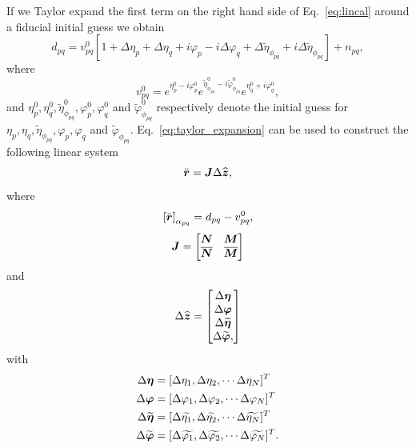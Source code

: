 \documentclass[useAMS,usenatbib]{mn2e}
\newcommand{\bz}{\bmath{z}}
\newcommand{\br}{\bmath{r}}
\newcommand{\bJ}{\bmath{J}}
\newcommand{\bN}{\bmath{N}}
\newcommand{\bM}{\bmath{M}}
\newcommand{\conj}[1]{\overline{#1}}
\begin{document}
If we Taylor expand the first term on the right hand side of Eq.~\eqref{eq:lincal} around a fiducial initial guess we obtain
\begin{equation}
\label{eq:taylor_expansion}
d_{pq} = v_{pq}^0[1+\Delta \eta_p + \Delta \eta_q + i \varphi_p - i \Delta \varphi_q + \Delta \widetilde{\eta}_{\phi_{pq}} + i\Delta \widetilde{\eta}_{\phi_{pq}}] + n_{pq}, 
\end{equation}
where
\begin{equation}
v_{pq}^0 = e^{\eta_p^0 - i \varphi_p^0} e^{\widetilde{\eta}_{\phi_{pq}}^0 - i \widetilde{\varphi}_{\phi_{pq}}^0} e^{\eta_q^0 + i \varphi_q^0}, 
\end{equation}
and $\eta_p^0,\eta_q^0,\widetilde{\eta}_{\phi_{pq}}^0,\varphi_p^0,\varphi_q^0$ and $\widetilde{\varphi}_{\phi_{pq}}^0$ respectively denote the initial guess for $\eta_p,\eta_q,\widetilde{\eta}_{\phi_{pq}},\varphi_p,\varphi_q$ and $\widetilde{\varphi}_{\phi_{pq}}$.
Eq.~\eqref{eq:taylor_expansion} can be used to construct the following linear system
\begin{equation}
\breve{\br} = \bJ\Delta\widehat{\bz}, 
\end{equation}
where 
\begin{equation}
\left [ \breve{\br} \right ]_{\alpha_{pq}} = d_{pq}-v_{pq}^0, 
\end{equation}
\begin{equation}
\label{eq:jac_lincal}
\bJ = \begin{bmatrix}
      \bN & \bM\\
      \conj{\bN} & \conj{\bM}
      \end{bmatrix}
\end{equation}
and
\begin{equation}
\Delta\widehat{\bz} = 
\begin{bmatrix}
\Delta \bmath{\eta} \\
\Delta \bmath{\varphi} \\
\Delta \widetilde{\bmath{\eta}} \\
\Delta \widetilde{\bmath{\varphi}},
\end{bmatrix}
\end{equation}
with
\begin{align}
 \Delta \bmath{\eta} &= [\Delta \eta_1,\Delta \eta_2,\cdots \Delta \eta_N]^T\nonumber\\
 \Delta \bmath{\varphi} &= [\Delta \varphi_1,\Delta \varphi_2,\cdots \Delta \varphi_N]^T\nonumber\\
 \Delta \widetilde{\bmath{\eta}} &= [\Delta \widetilde{\eta_1},\Delta \widetilde{\eta_2},\cdots \Delta \widetilde{\eta_N}]^T\nonumber\\
 \Delta \widetilde{\bmath{\varphi}} &= [\Delta \widetilde{\varphi_1},\Delta \widetilde{\varphi_2},\cdots \Delta \widetilde{\varphi_N}]^T.
\end{align}
\end{document}
